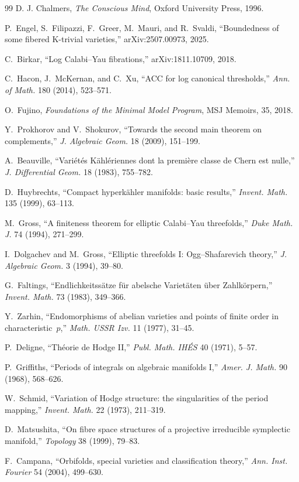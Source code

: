 \documentclass[11pt,openany]{book}
\begin{document}
\begin{thebibliography}{99}
D. J. Chalmers,
\textit{The Conscious Mind},
Oxford University Press, 1996.

P.~Engel, S.~Filipazzi, F.~Greer, M.~Mauri, and R.~Svaldi,
``Boundedness of some fibered K-trivial varieties,''
arXiv:2507.00973, 2025.

C.~Birkar,
``Log Calabi--Yau fibrations,''
arXiv:1811.10709, 2018.

C.~Hacon, J.~McKernan, and C.~Xu,
``ACC for log canonical thresholds,''
\textit{Ann. of Math.} 180 (2014), 523--571.

O.~Fujino,
\textit{Foundations of the Minimal Model Program},
MSJ Memoirs, 35, 2018.

Y.~Prokhorov and V.~Shokurov,
``Towards the second main theorem on complements,''
\textit{J. Algebraic Geom.} 18 (2009), 151--199.

A.~Beauville,
``Vari\'{e}t\'{e}s K\"{a}hl\'{e}riennes dont la premi\`{e}re classe de Chern est nulle,''
\textit{J. Differential Geom.} 18 (1983), 755--782.

D.~Huybrechts,
``Compact hyperk\"{a}hler manifolds: basic results,''
\textit{Invent. Math.} 135 (1999), 63--113.

M.~Gross,
``A finiteness theorem for elliptic Calabi--Yau threefolds,''
\textit{Duke Math. J.} 74 (1994), 271--299.

I.~Dolgachev and M.~Gross,
``Elliptic threefolds I: Ogg--Shafarevich theory,''
\textit{J. Algebraic Geom.} 3 (1994), 39--80.

G.~Faltings,
``Endlichkeitss\"{a}tze f\"{u}r abelsche Variet\"{a}ten \"{u}ber Zahlk\"{o}rpern,''
\textit{Invent. Math.} 73 (1983), 349--366.

Y.~Zarhin,
``Endomorphisms of abelian varieties and points of finite order in characteristic~$p$,''
\textit{Math. USSR Izv.} 11 (1977), 31--45.

P.~Deligne,
``Th\'{e}orie de Hodge II,''
\textit{Publ. Math. IH\'ES} 40 (1971), 5--57.

P.~Griffiths,
``Periods of integrals on algebraic manifolds I,''
\textit{Amer. J. Math.} 90 (1968), 568--626.

W.~Schmid,
``Variation of Hodge structure: the singularities of the period mapping,''
\textit{Invent. Math.} 22 (1973), 211--319.

D.~Matsushita,
``On fibre space structures of a projective irreducible symplectic manifold,''
\textit{Topology} 38 (1999), 79--83.

F.~Campana,
``Orbifolds, special varieties and classification theory,''
\textit{Ann. Inst. Fourier} 54 (2004), 499--630.

\end{thebibliography}
\end{document}
